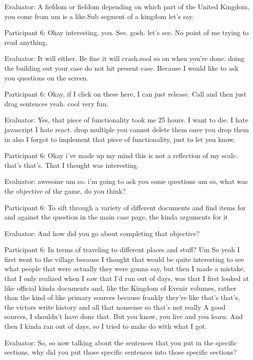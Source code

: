 \documentclass{l4proj}
\begin{document}
\begin{appendices}
Evaluator: A fiefdom or fiefdom depending on which part of the United Kingdom, you come from um is a like.Sub segment of a kingdom let's say.

Participant 6: Okay interesting. you. See. gosh. let's see. No point of me trying to read anything.

Evaluator: It will either. Be fine it will crash.cool so on when you're done. doing the building out your case do not hit present case. Because I would like to ask you questions on the screen.

Participant 6: Okay, if I click on these here, I can just release. Call and then just drag sentences yeah. cool very fun.

Evaluator: Yes, that piece of functionality took me 25 hours. I want to die. I hate javascript I hate react. drop multiple you cannot delete them once you drop them in also I forgot to implement that piece of functionality, just to let you know.

Participant 6: Okay i've made up my mind this is not a reflection of my scale. that's that's. That I thought was interesting.

Evaluator: awesome um so. i'm going to ask you some questions um so, what was the objective of the game, do you think?

Participant 6: To sift through a variety of different documents and find items for and against the question in the main case page, the kinda arguments for it

Evaluator: And how did you go about completing that objective?

Participant 6: In terms of traveling to different places and stuff? Um So yeah I first went to the village because I thought that would be quite interesting to see what people that were actually they were gonna say, but then I made a mistake, that I only realized when I saw that I’d run out of days, was that I first looked at like official kinda documents and, like the Kingdom of Evenir volumes, rather than the kind of like primary sources because frankly they're like that's that's, the victors write history and all that nonsense so that's not really A good sources, I shouldn’t have done that. But you know, you live and you learn. And then I kinda ran out of days, so I tried to make do with what I got.  

Evaluator: So, so now talking about the sentences that you put in the specific sections, why did you put those specific sentences into those specific sections?

 
 


\end{appendices}
\end{document}
